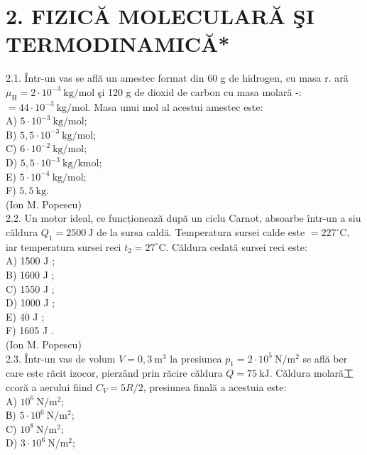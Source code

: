
\section*{2. FIZICĂ MOLECULARĂ ŞI TERMODINAMICĂ*}
2.1. Într-un vas se află un amestec format din 60 g de hidrogen, cu masa r. arã $\mu_{\mathrm{H}}=2 \cdot 10^{-3} \mathrm{~kg} / \mathrm{mol}$ şi 120 g de dioxid de carbon cu masa molară -: $=44 \cdot 10^{-3} \mathrm{~kg} / \mathrm{mol}$. Masa unui mol al acestui amestec este:\\
A) $5 \cdot 10^{-3} \mathrm{~kg} / \mathrm{mol}$;\\
B) $5,5 \cdot 10^{-3} \mathrm{~kg} / \mathrm{mol}$;\\
C) $6 \cdot 10^{-2} \mathrm{~kg} / \mathrm{mol}$;\\
D) $5,5 \cdot 10^{-3} \mathrm{~kg} / \mathrm{kmol}$;\\
E) $5 \cdot 10^{-4} \mathrm{~kg} / \mathrm{mol}$;\\
F) $5,5 \mathrm{~kg}$.\\
(Ion M. Popescu)\\
2.2. Un motor ideal, ce funcționează după un ciclu Carnot, absoarbe într-un a siu căldura $Q_{1}=2500 \mathrm{~J}$ de la sursa caldă. Temperatura sursei calde este $=227^{\circ} \mathrm{C}$, iar temperatura sursei reci $t_{2}=27^{\circ} \mathrm{C}$. Căldura cedată sursei reci este:\\
A) 1500 J ;\\
B) 1600 J ;\\
C) 1550 J ;\\
D) 1000 J ;\\
E) 40 J ;\\
F) 1605 J .\\
(Ion M. Popescu)\\
2.3. Într-un vas de volum $V=0,3 \mathrm{~m}^{3}$ la presiunea $p_{1}=2 \cdot 10^{5} \mathrm{~N} / \mathrm{m}^{2}$ se află ber care este răcit izocor, pierzând prin răcire căldura $Q=75 \mathrm{~kJ}$. Căldura molară工ccoră a aerului fiind $C_{V}=5 R / 2$, presiunea finală a acestuia este:\\
A) $10^{6} \mathrm{~N} / \mathrm{m}^{2}$;\\
В) $5 \cdot 10^{6} \mathrm{~N} / \mathrm{m}^{2}$;\\
C) $10^{8} \mathrm{~N} / \mathrm{m}^{2}$;\\
D) $3 \cdot 10^{6} \mathrm{~N} / \mathrm{m}^{2}$;\\
